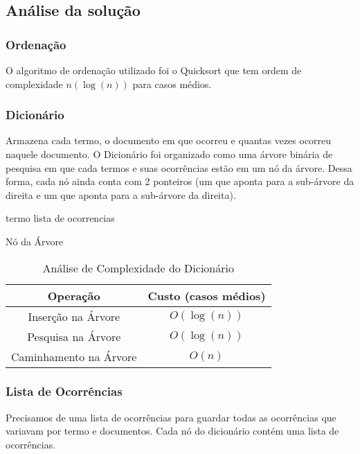 \documentclass[12pt]{article}
\begin{document}
\subsection{Análise da solução}

\subsubsection{Ordenação}
O algoritmo de ordenação utilizado foi o Quicksort que tem ordem de complexidade
$n(\log(n))$ para casos médios.

\subsubsection{Dicionário}
Armazena cada termo, o documento em que ocorreu e quantas
vezes ocorreu naquele documento. O Dicionário foi organizado como uma árvore 
binária de pesquisa em que cada termos e suas ocorrências estão em um nó da 
árvore. Dessa forma, cada nó ainda conta com 2 ponteiros (um que aponta para 
a sub-árvore da direita e um que aponta para a sub-árvore da direita).

\begin{algorithm}[h!]
\begin{footnotesize}
	termo\;
	lista de ocorrencias\;
\caption{Nó da Árvore}
\end{footnotesize}
\end{algorithm}

\begin{table}[ht]
  \caption{Análise de Complexidade do Dicionário}
  \centering
  \begin{footnotesize}
  \begin{tabular}{c c}
  \hline\hline
  Operação & Custo (casos médios) \\
  \hline
  Inserção na Árvore & $O(\log(n))$ \\
  Pesquisa na Árvore & $O(\log(n))$ \\
  Caminhamento na Árvore & $O(n)$ \\
  \hline
  \end{tabular}
  \end{footnotesize}
\end{table}

\subsubsection{Lista de Ocorrências}

Precisamos de uma lista de ocorrências para guardar todas as ocorrências que
variavam por termo e documentos. Cada nó do dicionário contém uma lista de
ocorrências.
\end{document}
